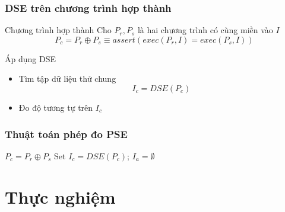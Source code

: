 \documentclass{beamer}
\begin{document}
\begin{frame}
\frametitle{DSE trên chương trình hợp thành}
\begin{block}{Chương trình hợp thành}
Cho $ P_{r}, P_{s} $ là hai chương trình có cùng miền vào $ I $
\[ P_{c} = P_{r} \oplus P_{s} \equiv assert(exec(P_{r}, I) = exec(P_{s}, I)) \]
\end{block}
\begin{block}{Áp dụng DSE}
\begin{itemize}
	\item Tìm tập dữ liệu thử chung 
	\[ I_{c} = DSE(P_{c}) \]
	\item Đo độ tương tự trên $ I_c $
\end{itemize}
\end{block}
\end{frame}

\begin{frame}
  \frametitle{Thuật toán phép đo PSE}
  \begin{algorithm}[H]
  	$P_c = P_r \oplus P_s$\;
  	Set $I_c = DSE(P_c)$; $I_a = \emptyset$ \;
  	{  			
  	}
  \end{algorithm}
\end{frame}


\section{Thực nghiệm}
\end{document}
